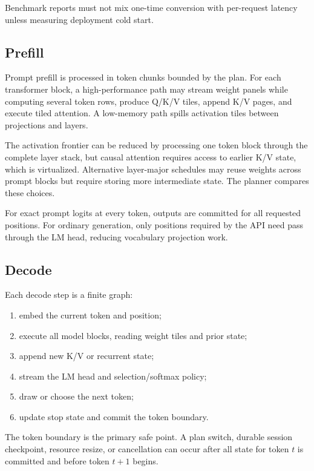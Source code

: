 Benchmark reports must not mix one-time conversion with per-request latency unless measuring deployment cold start.

\subsection{Prefill}

Prompt prefill is processed in token chunks bounded by the plan. For each transformer block, a high-performance path may stream weight panels while computing several token rows, produce Q/K/V tiles, append K/V pages, and execute tiled attention. A low-memory path spills activation tiles between projections and layers.

The activation frontier can be reduced by processing one token block through the complete layer stack, but causal attention requires access to earlier K/V state, which is virtualized. Alternative layer-major schedules may reuse weights across prompt blocks but require storing more intermediate state. The planner compares these choices.

For exact prompt logits at every token, outputs are committed for all requested positions. For ordinary generation, only positions required by the API need pass through the LM head, reducing vocabulary projection work.

\subsection{Decode}

Each decode step is a finite graph:

\begin{enumerate}
  \item embed the current token and position;
  \item execute all model blocks, reading weight tiles and prior state;
  \item append new K/V or recurrent state;
  \item stream the LM head and selection/softmax policy;
  \item draw or choose the next token;
  \item update stop state and commit the token boundary.
\end{enumerate}

The token boundary is the primary safe point. A plan switch, durable session checkpoint, resource resize, or cancellation can occur after all state for token $t$ is committed and before token $t+1$ begins.

